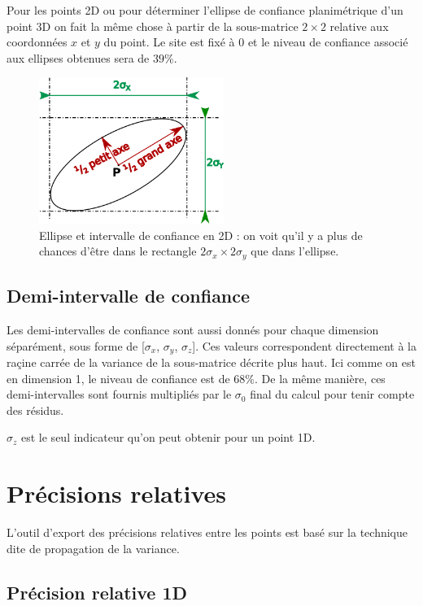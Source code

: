 \documentclass[french]{report}
\begin{document}
Pour les points 2D ou pour déterminer l'ellipse de confiance planimétrique d'un point 3D
on fait la même chose à partir de la sous-matrice $2 \times 2$ relative aux coordonnées  $x$ et $y$ du point. Le site est fixé à 0 et le niveau de confiance associé aux ellipses obtenues sera de $39\%$.

\begin{figure}[h]
\begin{center}
\includegraphics[width = 6cm]{images/ellips}
\caption{Ellipse et intervalle de confiance en 2D : on voit qu'il y a plus de chances d'être dans le rectangle $2 \sigma_x \times 2 \sigma_y$ que dans l'ellipse.}
\end{center}
\end{figure}

\subsection{Demi-intervalle de confiance}

Les demi-intervalles de confiance sont aussi donnés pour chaque dimension séparément, sous forme de [$\sigma_x$, $\sigma_y$, $\sigma_z$]. Ces valeurs correspondent directement à la raçine carrée de la variance de la sous-matrice décrite plus haut.
Ici comme on est en dimension 1, le niveau de confiance est de $68\%$. De la même manière, ces demi-intervalles sont fournis multipliés par le $\sigma_0$ final du calcul pour tenir compte des résidus.


$\sigma_z$ est le seul indicateur qu'on peut obtenir pour un point 1D.


\section{Précisions relatives}

L'outil d'export des précisions relatives entre les points est basé sur la technique dite de propagation de la variance.


\subsection{Précision relative 1D}
\end{document}
